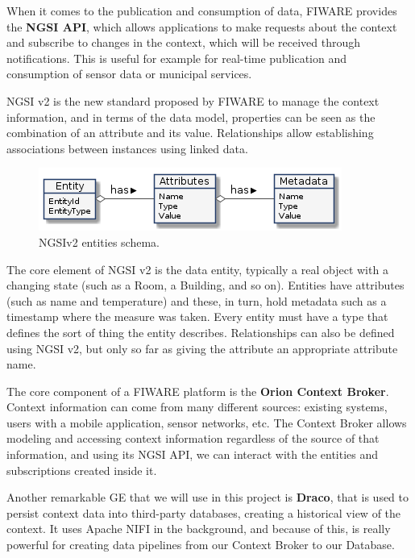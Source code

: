 When it comes to the publication and consumption of data, FIWARE  provides the \textbf{NGSI API}, which allows applications to make requests about the context and subscribe to changes in the context, which will be received through notifications. This is useful for example for real-time publication and consumption of sensor data or municipal services.

NGSI v2 is the new standard proposed by FIWARE to manage the context information, and in terms of the data model, properties can be seen as the combination of an attribute and its value. Relationships allow establishing associations between instances using linked data.

\begin{figure}[H]
	\centering
	\includegraphics[width=0.8\linewidth]{imagenes/ngsi-v2.png}
	\caption{NGSIv2 entities schema. \cite{fiware-docs}}
	\label{ngsi-v2}
\end{figure}

The core element of NGSI v2 is the data entity, typically a real object with a changing state (such as a Room, a Building, and so on). Entities have attributes (such as name and temperature) and these, in turn, hold metadata such as a timestamp where the measure was taken. Every entity must have a type that defines the sort of thing the entity describes. Relationships can also be defined using NGSI v2, but only so far as giving the attribute an appropriate attribute name.

The core component of a FIWARE platform is the \textbf{Orion Context Broker}. Context information can come from many different sources: existing systems, users with a mobile application, sensor networks, etc. The Context Broker allows modeling and accessing context information regardless of the source of that information, and using its NGSI API, we can interact with the entities and subscriptions created inside it.

Another remarkable GE that we will use in this project is \textbf{Draco}, that is used to persist context data into third-party databases, creating a historical view of the context. It uses Apache NIFI in the background, and because of this, is really powerful for creating data pipelines from our Context Broker to our Database.

